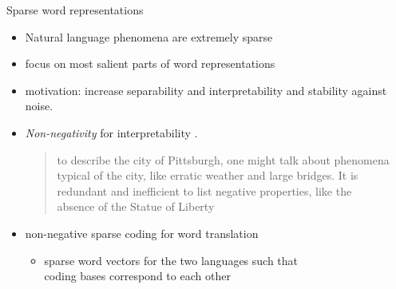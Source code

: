 \documentclass{beamer}
\newlength{\sepwid}
\newlength{\onecolwid}
\newcommand{\bull}[1]{
  \begin{itemize}
    \item #1
  \end{itemize}
}
\begin{document}
\begin{frame}[t] 
  \begin{columns}[t] %

    \begin{column}{\sepwid} %
    \end{column}   

    \begin{column}{\onecolwid} %

      \begin{block}{Sparse word representations}

        \begin{itemize} 
          \item Natural language phenomena are extremely sparse 
          \item focus on most salient parts of word representations \\
            \citep{Faruqui:2015,Berend:2017,Subramanian:2018}

          \item motivation: increase separability and interpretability
            \citep{Olshausen:1997} and stability against noise.

          \item \emph{Non-negativity} for interpretability
            \citep{Faruqui:2015,Fyshe:2015,Arora:2016}. 

            \begin{quotation} 
              to describe the city of Pittsburgh, one might talk about phenomena
              typical of the city, like erratic weather and large bridges. It is
              redundant and inefficient to list negative properties, like the
              absence of the Statue of Liberty \citep{Subramanian:2018}
            \end{quotation} 
          \item non-negative sparse coding for word translation \\
            \citep{Berend:2018} 
            \bull{sparse word vectors for the two languages such that \\ coding
            bases correspond to each other}


\end{itemize}
\end{block}
\end{column}
\end{columns}
\end{frame}
\end{document}
